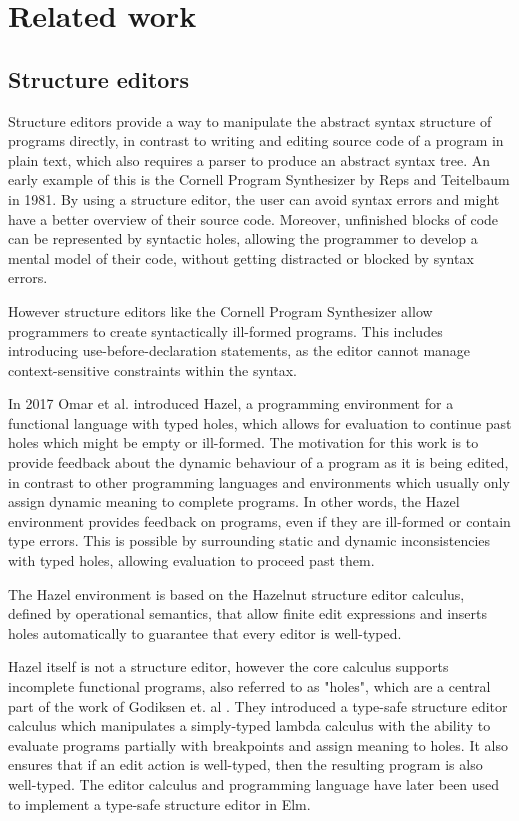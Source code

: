 
\section{Related work}

\subsection{Structure editors}
Structure editors provide a way to manipulate the abstract syntax structure of programs directly, in contrast to writing and editing source code of a program in plain text, which also requires a parser to produce an abstract syntax tree. An early example of this is the Cornell Program Synthesizer by Reps and Teitelbaum\cite{timtom81} in 1981.
By using a structure editor, the user can avoid syntax errors and might have a better overview of their source code. Moreover, unfinished blocks of code can be represented by syntactic holes, allowing the programmer to develop a mental model of their code, without getting distracted or blocked by syntax errors.

However structure editors like the Cornell Program Synthesizer\cite{timtom81} allow programmers to create syntactically ill-formed programs. This includes introducing use-before-declaration statements, as the editor cannot manage context-sensitive constraints within the syntax.

In 2017 Omar et al. introduced Hazel\cite{omar}, a programming environment for a functional language with typed holes, which allows for evaluation to continue past holes which might be empty or ill-formed. The motivation for this work is to provide feedback about the dynamic behaviour of a program as it is being edited, in contrast to other programming languages and environments which usually only assign dynamic meaning to complete programs. In other words, the Hazel environment\cite{omar} provides feedback on programs, even if they are ill-formed or contain type errors. This is possible by surrounding static and dynamic inconsistencies with typed holes, allowing evaluation to proceed past them.

The Hazel environment is based on the Hazelnut structure editor calculus, defined by operational semantics, that allow finite edit expressions and inserts holes automatically to guarantee that every editor is well-typed.

Hazel itself is not a structure editor, however the core calculus supports incomplete functional programs, also referred to as "holes", which are a central part of the work of Godiksen et. al \cite{godiksen}. They introduced a type-safe structure editor calculus which manipulates a simply-typed lambda calculus with the ability to evaluate programs partially with breakpoints and assign meaning to holes. It also ensures that if an edit action is well-typed, then the resulting program is also well-typed. The editor calculus and programming language have later been used to implement a type-safe structure editor in Elm\cite{KU-bach}.

